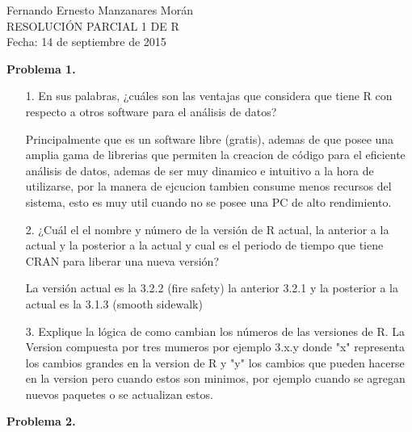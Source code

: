 \documentclass{article}
\begin{document}

\begin{center}
Fernando Ernesto Manzanares Morán
\\ RESOLUCIÓN PARCIAL 1 DE R
\\ Fecha: 14 de septiembre de 2015 

\end{center}
\textbf{Problema 1.}
\begin{itemize}
\item [1.]En sus palabras, ¿cuáles son las ventajas que considera que tiene R con respecto a otros software para el análisis de datos?

\subitem Principalmente que es un software libre (gratis), ademas de que posee una amplia gama de librerias que permiten la creacion de código para el eficiente análisis de datos, ademas de ser muy dinamico e intuitivo a la hora de utilizarse, por la manera de ejcucion tambien consume menos recursos del sistema, esto es muy util cuando no se posee una PC de alto rendimiento.

\item [2.] ¿Cuál el el nombre y número de la versión de R actual, la anterior a la actual y la posterior a la actual y cual es el periodo de tiempo que tiene CRAN para liberar una nueva versión?

\subitem La versión actual es la 3.2.2 (fire safety) la anterior 3.2.1 y la posterior a la actual es la 3.1.3 (smooth sidewalk)

\item [3.] Explique la lógica de como cambian los números de las versiones de R.
\subitem La Version compuesta por tres mumeros por ejemplo 3.x.y donde "x" representa los cambios grandes en la version de R y "y" los cambios que pueden hacerse en la version pero cuando estos son minimos, por ejemplo cuando se agregan nuevos paquetes o se actualizan estos.

\end{itemize}

\textbf{Problema 2.}
\end{document}
